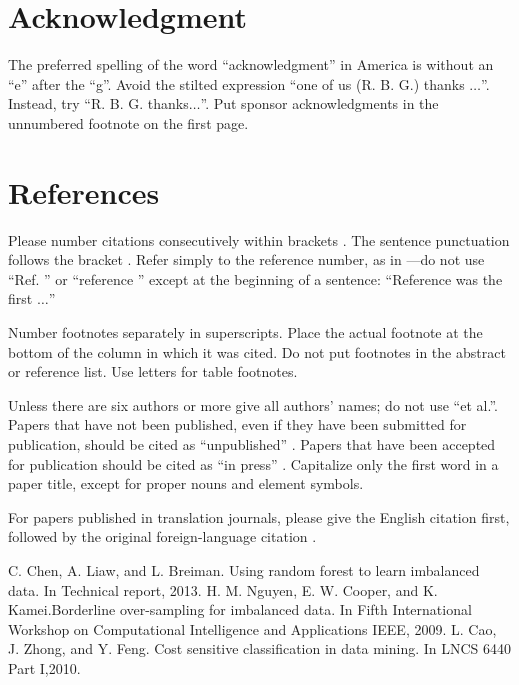 \documentclass[conference]{IEEEtran}
\begin{document}
\section*{Acknowledgment}

The preferred spelling of the word ``acknowledgment'' in America is without 
an ``e'' after the ``g''. Avoid the stilted expression ``one of us (R. B. 
G.) thanks $\ldots$''. Instead, try ``R. B. G. thanks$\ldots$''. Put sponsor 
acknowledgments in the unnumbered footnote on the first page.

\section*{References}

Please number citations consecutively within brackets \cite{b1}. The 
sentence punctuation follows the bracket \cite{b2}. Refer simply to the reference 
number, as in \cite{b3}---do not use ``Ref. \cite{b3}'' or ``reference \cite{b3}'' except at 
the beginning of a sentence: ``Reference \cite{b3} was the first $\ldots$''

Number footnotes separately in superscripts. Place the actual footnote at 
the bottom of the column in which it was cited. Do not put footnotes in the 
abstract or reference list. Use letters for table footnotes.

Unless there are six authors or more give all authors' names; do not use 
``et al.''. Papers that have not been published, even if they have been 
submitted for publication, should be cited as ``unpublished'' \cite{b4}. Papers 
that have been accepted for publication should be cited as ``in press'' \cite{b5}. 
Capitalize only the first word in a paper title, except for proper nouns and 
element symbols.

For papers published in translation journals, please give the English 
citation first, followed by the original foreign-language citation \cite{b6}.

\begin{thebibliography}{00}

 C. Chen, A. Liaw, and L. Breiman. Using random forest to learn imbalanced data. In Technical report, 2013.
 H. M. Nguyen, E. W. Cooper, and K. Kamei.Borderline over-sampling for imbalanced data. In Fifth International Workshop on Computational Intelligence and Applications IEEE, 2009.
 L. Cao, J. Zhong, and Y. Feng. Cost sensitive classification in data mining. In LNCS 6440 Part I,2010.
\end{thebibliography}
\fi
\end{document}
